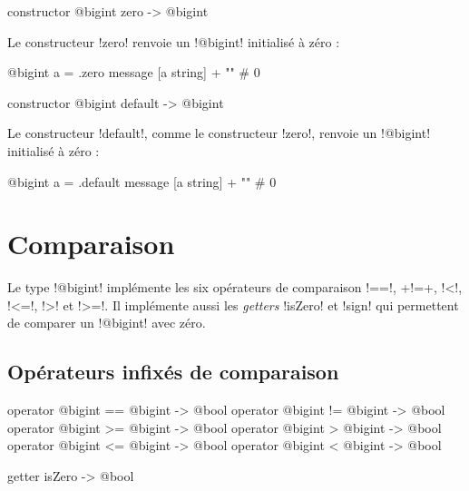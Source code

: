 
\begin{galgas4box}
constructor @bigint zero -> @bigint
\end{galgas4box}

Le constructeur \ggsq!zero! renvoie un \ggsq!@bigint! initialisé à zéro :
\begin{galgas4}
@bigint a = .zero
message [a string] + "\n" # 0
\end{galgas4}



\begin{galgas4box}
constructor @bigint default -> @bigint
\end{galgas4box}

Le constructeur \ggsq!default!, comme le constructeur \ggsq!zero!, renvoie un \ggsq!@bigint! initialisé à zéro :
\begin{galgas4}
@bigint a = .default
message [a string] + "\n" # 0
\end{galgas4}











\section{Comparaison}

Le type \ggsq!@bigint! implémente les six opérateurs de comparaison \ggsq!==!, \ggsq+!=+, \ggsq!<!, \ggsq!<=!, \ggsq!>! et \ggsq!>=!. Il implémente aussi les \emph{getters} \ggsq!isZero! et \ggsq!sign! qui permettent de comparer un \ggsq!@bigint! avec zéro.

\subsection{Opérateurs infixés de comparaison}

\begin{galgas4box}
operator @bigint == @bigint -> @bool
operator @bigint != @bigint -> @bool
operator @bigint >= @bigint -> @bool
operator @bigint >  @bigint -> @bool
operator @bigint <= @bigint -> @bool
operator @bigint <  @bigint -> @bool
\end{galgas4box}


\begin{galgas4box}
getter isZero -> @bool
\end{galgas4box}

